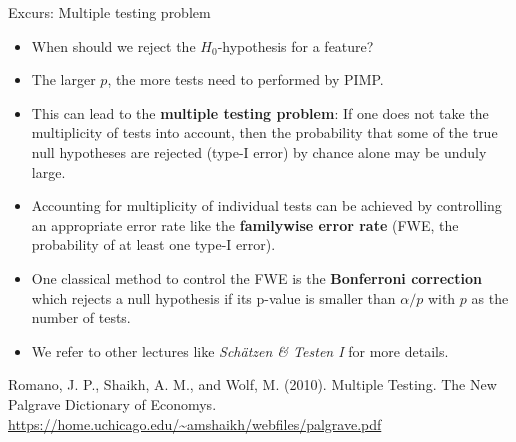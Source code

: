 \documentclass[11pt,compress,t,notes=noshow, xcolor=table]{beamer}
\begin{document}
\begin{vbframe}{Excurs: Multiple testing problem}
\begin{itemize}
  \item When should we reject the $H_0$-hypothesis for a feature? 
  \item The larger $p$, the more tests need to performed by PIMP. 
  \item This can lead to the \textbf{multiple testing problem}: If one does not take the multiplicity of tests into account, then the probability that some of the true null hypotheses are rejected (type-I error) by chance alone may be unduly large.
  \item Accounting for multiplicity of individual tests can be achieved by controlling
  an appropriate error rate like the \textbf{familywise error rate} (FWE, the probability of at least one type-I error). 
  \item One classical method to control the FWE is the \textbf{Bonferroni correction} which rejects a null hypothesis if its p-value is smaller than $\alpha/p$ with $p$ as the number of tests. 
  \item We refer to other lectures like \textit{Schätzen \& Testen I} for more details.
  \end{itemize} 
  \vspace{0.2cm}
  {\tiny{Romano, J. P., Shaikh, A. M., and Wolf, M. (2010). Multiple Testing. The New Palgrave Dictionary of Economys. \url{https://home.uchicago.edu/~amshaikh/webfiles/palgrave.pdf}}\par}
\end{vbframe}


\endlecture
\end{document}
